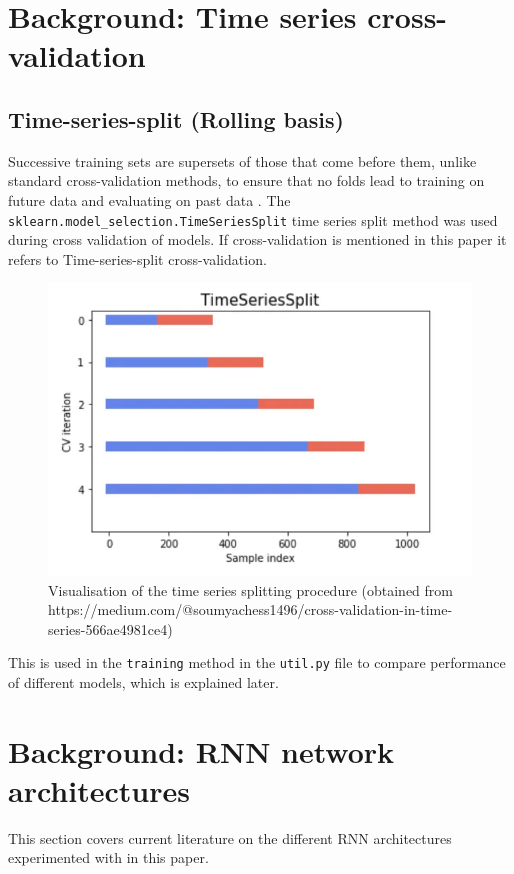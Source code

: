 \documentclass[conference]{IEEEtran}
\begin{document}
\section{Background: Time series cross-validation}

\subsection{Time-series-split (Rolling basis)}

Successive training sets are supersets of those that come before them, unlike standard cross-validation methods, to ensure that no folds lead to training on future data and evaluating on past data \cite{shrivastava2020cross}. The \texttt{sklearn.model\_selection.TimeSeriesSplit} time series split method was used during cross validation of models. If cross-validation is mentioned in this paper it refers to Time-series-split cross-validation.

\begin{figure}[H] 
	\centering
	\includegraphics[width=0.7\linewidth]{../images/split.png}
	\caption{Visualisation of the time series splitting procedure (obtained from https://medium.com/@soumyachess1496/cross-validation-in-time-series-566ae4981ce4)}
	\label{fig:split}
\end{figure}

This is used in the \texttt{training} method in the \texttt{util.py} file to compare performance of different models, which is explained later.

\section{Background: RNN network architectures}

This section covers current literature on the different RNN architectures experimented with in this paper.
\end{document}
